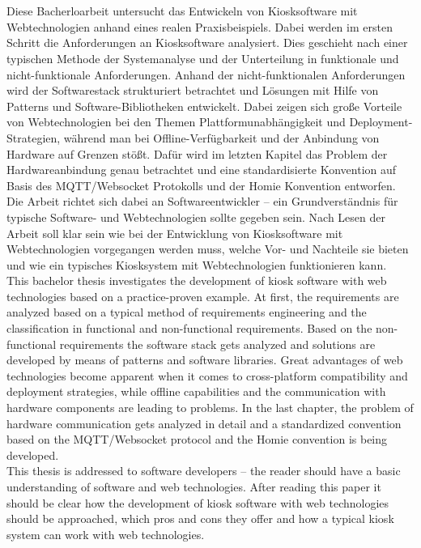 \chapter{\abstractname}

Diese Bacherloarbeit untersucht das Entwickeln von Kiosksoftware mit Webtechnologien
anhand eines realen Praxisbeispiels. Dabei werden im ersten Schritt die Anforderungen
an Kiosksoftware analysiert. Dies geschieht nach einer typischen Methode der Systemanalyse
und der Unterteilung in funktionale und nicht-funktionale Anforderungen. 
Anhand der nicht-funktionalen Anforderungen
wird der Softwarestack strukturiert betrachtet und Lösungen mit Hilfe von Patterns und 
Software-Bibliotheken entwickelt. 
Dabei zeigen sich große Vorteile von Webtechnologien bei den Themen
Plattformunabhängigkeit und Deployment-Strategien, während man bei Offline-Verfügbarkeit und der
Anbindung von Hardware auf Grenzen stößt. Dafür wird im letzten Kapitel das Problem der
Hardwareanbindung genau betrachtet und eine standardisierte Konvention auf
Basis des MQTT/Websocket Protokolls und der Homie Konvention entworfen.\\
Die Arbeit richtet sich dabei an Softwareentwickler -- ein Grundverständnis für typische 
Software- und Webtechnologien sollte gegeben sein. Nach Lesen der Arbeit soll klar sein
wie bei der Entwicklung von Kiosksoftware mit Webtechnologien vorgegangen werden muss, welche
Vor- und Nachteile sie bieten und wie ein typisches Kiosksystem mit Webtechnologien funktionieren
kann. \\

This bachelor thesis investigates the development of kiosk software with web technologies based
on a practice-proven example. At first, the requirements are analyzed based on a typical
method of requirements engineering and the classification in functional and non-functional requirements. 
Based on the non-functional requirements the software stack gets analyzed and solutions are 
developed by means of patterns and software libraries. Great advantages of web technologies
become apparent when it comes to cross-platform compatibility and deployment strategies, while
offline capabilities and the communication with hardware components are leading to problems. 
In the last chapter, the problem of hardware communication gets analyzed in detail
and a standardized convention based on the MQTT/Websocket protocol and the Homie convention 
is being developed.\\
This thesis is addressed to software developers -- the reader should have a basic understanding of
software and web technologies. After reading this paper it should be clear how the development of
kiosk software with web technologies should be approached, which pros and cons they offer and
how a typical kiosk system can work with web technologies. 
